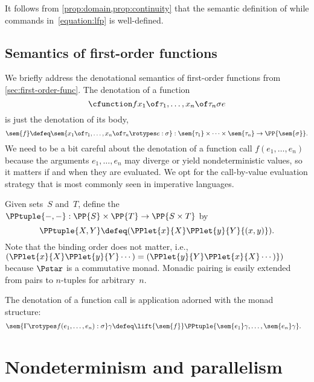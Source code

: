 It follows from \cref{prop:domain,prop:continuity} that the semantic definition of while commands in~\eqref{equation:lfp} is well-defined.


\subsection{Semantics of first-order functions}
\label{sec:semant-first-order}

We briefly address the denotational semantics of first-order functions from \cref{sec:first-order-func}.
The denotation of a function
%
\begin{equation*}
  \cfunction f {x_1 \of \tau_1, \ldots, x_n \of \tau_n} {\sigma} {e}
\end{equation*}
%
is just the denotation of its body,
%
\begin{equation*}
  \sem{f} \defeq
  \sem{x_1 \of \tau_1, \ldots, x_n \of \tau_n \rotypes e : \sigma} :
  \sem{\tau_1} \times \cdots \times \sem{\tau_n} \to \PP{\sem{\sigma}}.
\end{equation*}
%
We need to be a bit careful about the denotation of a function call $f(e_1, \ldots, e_n)$ because the arguments
$e_1, \ldots, e_n$ may diverge or yield nondeterministic values, so it matters if and when they are evaluated.
%
We opt for the call-by-value evaluation strategy that is most commonly seen in imperative languages.

Given sets~$S$ and~$T$, define the 
%
$\PPtuple{{-}, {-}} : \PP{S} \times \PP{T} \to \PP{S \times T}$
%
by
%
\begin{equation*}
  \PPtuple{X, Y} \defeq (\PPlet{x}{X} \PPlet{y}{Y} \{(x, y)\}).
\end{equation*}
%
Note that the binding order does not matter, i.e., $(\PPlet{x}{X} \PPlet{y}{Y} \cdots) = (\PPlet{y}{Y} \PPlet{x}{X} \cdots)\})$ because $\Pstar$ is a commutative monad.
%
Monadic pairing is easily extended from pairs to $n$-tuples for arbitrary~$n$.

The denotation of a function call is application adorned with the monad structure:
%
\begin{align*}
  \sem{\Gamma \rotypes f(e_1, \ldots, e_n) : \sigma} \gamma \defeq &
  \lift{\sem{f}} \PPtuple{\sem{e_1} \gamma, \ldots, \sem{e_n} \gamma}.
\end{align*}


\section{Nondeterminism and parallelism}
\label{sec:boolean-ops}

